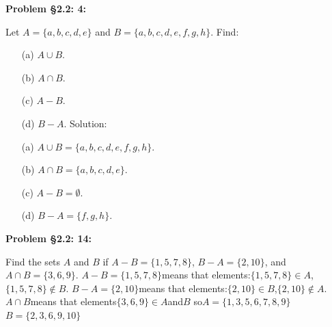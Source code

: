 \documentclass{article}
\newenvironment{problem}[1]
{\begin{mdframed}[default]
\textbf{Problem #1:}
}
{\end{mdframed}
}
\begin{document}
\begin{problem}{\S 2.2: 4}
Let $A = \{ a, b, c, d, e \}$ and $B = \{ a, b, c, d, e, f, g, h \}$. Find:
\begin{enumerate}
\item[(a)] $A \cup B$.
\item[(b)] $A \cap B$.
\item[(c)] $A - B$.
\item[(d)] $B - A$.\newline\newline
Solution:
\item[(a)] $A \cup B=\{a,b,c,d,e,f,g,h\}$.
\item[(b)] $A \cap B=\{a,b,c,d,e\}$.
\item[(c)] $A - B=\emptyset$.
\item[(d)] $B - A=\{f,g,h\}$.
\end{enumerate}


\end{problem}
\begin{problem}{\S 2.2: 14}
Find the sets $A$ and $B$ if $A - B = \{ 1, 5, 7, 8 \}$, $B-A = \{ 2, 10 \}$, and
$A \cap B = \{ 3, 6, 9 \}$.\newline
$A-B=\{1,5,7,8\}$means that elements:$\{1,5,7,8\}\in A $,$\{1,5,7,8\} \notin B$.\newline
$B-A=\{2,10\}$means that elements:$\{2,10\}\in B $,$\{2,10\} \notin A$.\newline
$A \cap B$means that elements$\{3,6,9\} \in A$and$B$\newline
so\newline$A=\{1,3,5,6,7,8,9\}$\newline$B=\{2,3,6,9,10\}$
\end{problem}
\end{document}
